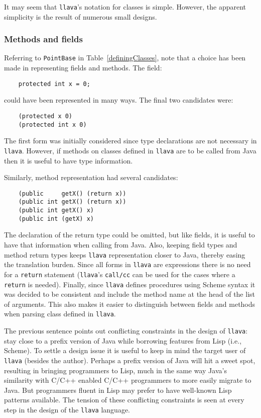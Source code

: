 \documentclass{acm-final/sig-alternate-modified}
\begin{document}
It may seem that {\tt llava}'s notation for classes is simple.
However, the apparent simplicity is the result of numerous small
designs.

\subsubsection{Methods and fields}

Referring to {\tt PointBase} in Table~\ref{definingClasses}, note that
a choice has been made in representing fields and methods.  The field:

\small
\begin{verbatim}
    protected int x = 0;
\end{verbatim}
\normalsize

could have been represented in many ways.  The final two candidates
were:

\small
\begin{verbatim}
    (protected x 0)
    (protected int x 0)
\end{verbatim}
\normalsize

The first form was initially considered since type declarations are
not necessary in {\tt llava}.  However, if methods on classes defined
in {\tt llava} are to be called from Java then it is useful to have
type information.

Similarly, method representation had several candidates:

\small
\begin{verbatim}
    (public     getX() (return x))
    (public int getX() (return x))
    (public int getX() x)
    (public int (getX) x)
\end{verbatim}
\normalsize

The declaration of the return type could be omitted, but like fields,
it is useful to have that information when calling from Java.  Also,
keeping field types and method return types keeps {\tt llava}
representation closer to Java, thereby easing the translation burden.
Since all forms in {\tt llava} are expressions there is no need for a
{\tt return} statement ({\tt llava}'s {\tt call/cc} can be used for
the cases where a {\tt return} is needed).  Finally, since {\tt llava}
defines procedures using Scheme syntax it was decided to be consistent
and include the method name at the head of the list of arguments.
This also makes it easier to distinguish between fields and methods
when parsing class defined in {\tt llava}.

The previous sentence points out conflicting constraints in the design
of {\tt llava}: stay close to a prefix version of Java while borrowing
features from Lisp (i.e., Scheme).  To settle a design issue it is
useful to keep in mind the target user of {\tt llava} (besides the
author).  Perhaps a prefix version of Java will hit a sweet spot,
resulting in bringing programmers to Lisp, much in the same way Java's
similarity with C/C++ enabled C/C++ programmers to more easily migrate
to Java.  But programmers fluent in Lisp may prefer to have well-known
Lisp patterns available.  The tension of these conflicting constraints
is seen at every step in the design of the {\tt llava} language.
\end{document}
